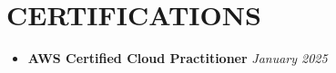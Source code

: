 \documentclass[letterpaper,10pt]{article}
\newcommand{\resumeSubHeadingListStart}{\begin{itemize}[leftmargin=0in,label={}]}
\newcommand{\resumeSubHeadingListEnd}{\end{itemize}}
\begin{document}
\section{CERTIFICATIONS}
\resumeSubHeadingListStart
\vspace{10pt}
\item {\small \textbf{AWS Certified Cloud Practitioner} \hfill \textit{January 2025}}
\resumeSubHeadingListEnd
\end{document}
